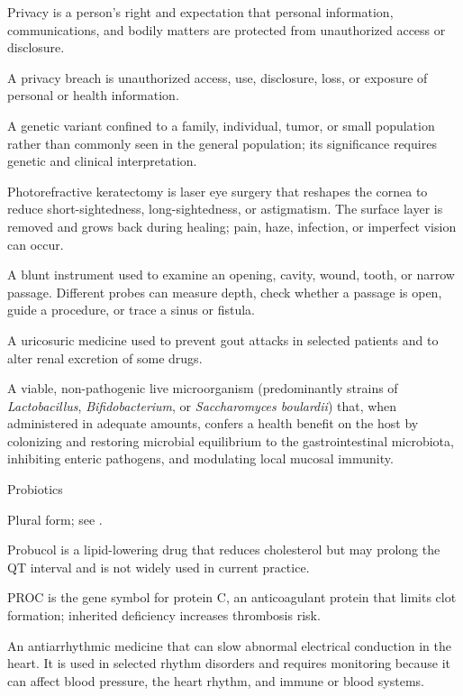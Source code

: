  Privacy is a person’s right and expectation that personal information, communications, and bodily matters are protected from unauthorized access or disclosure.

 A privacy breach is unauthorized access, use, disclosure, loss, or exposure of personal or health information.

 A genetic variant confined to a family, individual, tumor, or small population rather than commonly seen in the general population; its significance requires genetic and clinical interpretation.

 Photorefractive keratectomy is laser eye surgery that reshapes the cornea to reduce short-sightedness, long-sightedness, or astigmatism. The surface layer is removed and grows back during healing; pain, haze, infection, or imperfect vision can occur.

 A blunt instrument used to examine an opening, cavity, wound, tooth, or narrow passage. Different probes can measure depth, check whether a passage is open, guide a procedure, or trace a sinus or fistula.

 A uricosuric medicine used to prevent gout attacks in selected patients and to alter renal excretion of some drugs.

 A viable, non-pathogenic live microorganism (predominantly strains of \textit{Lactobacillus}, \textit{Bifidobacterium}, or \textit{Saccharomyces boulardii}) that, when administered in adequate amounts, confers a health benefit on the host by colonizing and restoring microbial equilibrium to the gastrointestinal microbiota, inhibiting enteric pathogens, and modulating local mucosal immunity.

\synonyms
Probiotics

 Plural form; see .

 Probucol is a lipid-lowering drug that reduces cholesterol but may prolong the QT interval and is not widely used in current practice.

 PROC is the gene symbol for protein C, an anticoagulant protein that limits clot formation; inherited deficiency increases thrombosis risk.

 An antiarrhythmic medicine that can slow abnormal electrical conduction in the heart. It is used in selected rhythm disorders and requires monitoring because it can affect blood pressure, the heart rhythm, and immune or blood systems.

